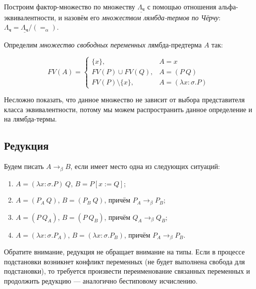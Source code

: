 \documentclass[10pt,a4paper,oneside]{article}
\begin{document}
\begin{definition}
Построим фактор-множество по множеству $\underline{\Lambda_\texttt{ч}}$ с помощью отношения
альфа-эквивалентности, и назовём его \emph{множеством лямбда-термов по Чёрчу}:
$\Lambda_\texttt{ч} = \underline{\Lambda_\texttt{ч}}/(=_\alpha)$.
\end{definition}

\begin{definition}
Определим \emph{множество свободных переменных} лямбда-предтерма $A$ так:

$$FV(A) = \left\{ \begin{array}{ll} 
       \{x\}, & A = x \\
       FV(P)\cup FV(Q), & A = (P\ Q) \\
       FV(P)\setminus \{x\}, & A = (\lambda x:\sigma.P)            
\end{array}  \right.$$
\end{definition}

Несложно показать, что данное множество не зависит от выбора представителя класса эквивалентности,
потому мы можем распространить данное определение и на лямбда-термы.

\subsection{Редукция}

\begin{definition}
Будем писать $A \rightarrow_\beta B$, если имеет место одна из следующих ситуаций:

\begin{enumerate}
\item $A = (\lambda x:\sigma.P)\ Q$, $B = P[x := Q]$;
\item $A = (P_A\ Q)$, $B = (P_B\ Q)$, причём $P_A\rightarrow_\beta P_B$;
\item $A = (P\ Q_A)$, $B = (P\ Q_B)$, причём $Q_A\rightarrow_\beta Q_B$;
\item $A = (\lambda x:\sigma.P_A)$, $B = (\lambda x:\sigma.P_B)$, причём $P_A\rightarrow_\beta P_B$.
\end{enumerate}
\end{definition}

Обратите внимание, редукция не обращает внимание на типы. Если в процессе подстановки 
возникнет конфликт переменных (не будет выполнена свобода для подстановки), то требуется
произвести переименование связанных переменных и продолжить редукцию --- аналогично
бестиповому исчислению.
\end{document}
